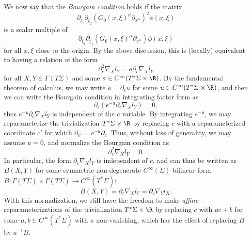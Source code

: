 \documentclass{article}
\numberwithin{equation}{section}
\theoremstyle{plain}
\begin{document}
We now say that the \emph{Bourgain condition} holds if the matrix
$$\partial_{\xi_i} \partial_{\xi_j} (G_0(x,\xi)^\alpha \partial_{x^\alpha})^2 \phi(x,\xi)$$
is a scalar multiple of
$$\partial_{\xi_i} \partial_{\xi_j} (G_0(x,\xi)^\alpha \partial_{x^\alpha}) \phi(x,\xi)$$
for all $x,\xi$ close to the origin.  By the above discussion, this is (locally) equivalent to having a relation of the form
$$ \partial_c^2 \nabla_X l_Y = a \partial_c \nabla_X l_Y$$
for all $X,Y \in \Gamma(T\Sigma)$ and some $a \in C^\infty(T^*\Sigma \times \R)$.  By the fundamental theorem of calculus, we may write $a = \partial_c u$ for some $u \in C^\infty(T^*\Sigma \times \R)$, and then we can write the Bourgain condition in integrating factor form as
$$ \partial_c (e^{-u} \partial_c \nabla_X l_Y) = 0,$$
thus $e^{-u} \partial_c \nabla_X l_Y$ is independent of the $c$ variable.  By integrating $e^{-u}$, we may reparameterize the trivialization $T^*\Sigma \times \R$ by replacing $c$ with a reparameterized coordinate $c'$ for which $\partial_{c'} = e^{-u} \partial_c$.  Thus, without loss of generality, we may assume $u=0$, and normalize the Bourgain condition as
$$ \partial_c^2 \nabla_X l_Y = 0.$$
In particular, the form $\partial_c \nabla_X l_Y$ is independent of $c$, and can thus be written as $B(X,Y)$ for some symmetric non-degenerate $C^\infty(\Sigma)$-bilinear form $B: \Gamma(T\Sigma) \times \Gamma(T\Sigma) \to C^\infty(T^*\Sigma)$:
\begin{equation}\label{bxy}
B(X,Y) = \partial_c \nabla_X l_Y = \partial_c \nabla_Y l_X.
\end{equation}
With this normalization, we still have the freedom to make \emph{affine} reparameterizations of the trivialization $T^*\Sigma \times \R$ by replacing $c$ with $ac + b$ for some $a,b \in C^\infty(T^*\Sigma)$ with $a$ non-vanishing, which has the effect of replacing $B$ by $a^{-1} B$.\\
\end{document}
